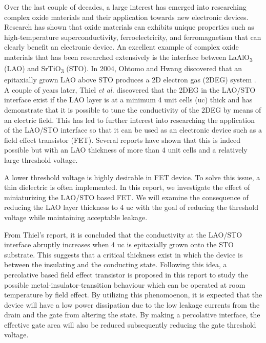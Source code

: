 \documentclass[11pt,a4paper]{report}
\begin{document}



Over the last couple of decades, a large interest has emerged into researching complex oxide materials and their application towards new electronic devices. Research has shown that oxide materials can exhibits unique properties such as high-temperature superconductivity, ferroelectricity, and ferromagnetism that can clearly benefit an electronic device. An excellent example of complex oxide materials that has been researched extensively is the interface between LaAlO\textsubscript{3} (LAO) and SrTiO\textsubscript{3} (STO). In 2004, Ohtomo and Hwang discovered that an epitaxially grown LAO above STO produces a 2D electron gas (2DEG) system \cite{ohtomo_hwang_2004}. A couple of years later, Thiel \textit{et al.} \cite{thiel_2006} discovered that the 2DEG in the LAO/STO interface exist if the LAO layer is at a minimum 4 unit cells (uc) thick and has demonstrate that it is possible to tune the conductivity of the 2DEG by means of an electric field. This has led to further interest into researching the application of the LAO/STO interface so that it can be used as an electronic device such as a field effect transistor (FET). Several reports have shown that this is indeed possible \cite{eerkes_wiel_hilgenkamp_2013,forg_richter_mannhart_2012,hosoda_hikita_hwang_bell_2013} but with an LAO thickness of more than 4 unit cells and a relatively large threshold voltage.

A lower threshold voltage is highly desirable in FET device. To solve this issue, a thin dielectric is often implemented. In this report, we investigate the effect of miniaturizing the LAO/STO based FET. We will examine the consequence of reducing the LAO layer thickness to 4 uc with the goal of reducing the threshold voltage while maintaining acceptable leakage.

From Thiel's \cite{thiel_2006} report, it is concluded that the conductivity at the LAO/STO interface abruptly increases when 4 uc is epitaxially grown onto the STO substrate. This suggests that a critical thickness exist in which the device is between the insulating and the conducting state. Following this idea, a percolative based field effect transistor is proposed in this report to study the possible metal-insulator-transition behaviour which can be operated at room temperature by field effect. By utilizing this phenomoenon, it is expected that the device will have a low power dissipation due to the low leakage currents from the drain and the gate from altering the state. By making a percolative interface, the effective gate area will also be reduced subsequently reducing the gate threshold voltage.
\end{document}
